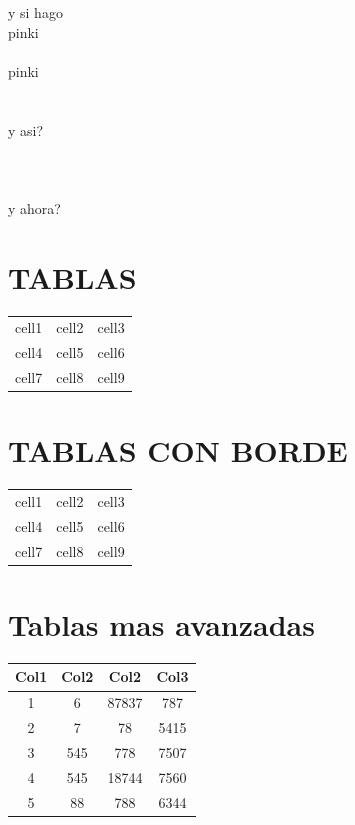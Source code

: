y si hago \\ pinki \\ \\ pinki \\ \\ \\ y asi? \\\\\\\\ y ahora?



\section*{TABLAS}
\begin{center}
\begin{tabular}{c c c}
 cell1 & cell2 & cell3 \\ 
 cell4 & cell5 & cell6 \\  
 cell7 & cell8 & cell9    
\end{tabular}
\end{center}


\section*{TABLAS CON BORDE}
\begin{center}
\begin{tabular}{|c|c|c|} 
 \hline
 cell1 & cell2 & cell3 \\ 
 cell4 & cell5 & cell6 \\ 
 cell7 & cell8 & cell9 \\ 
 \hline
\end{tabular}
\end{center}






\section* {Tablas mas avanzadas}
\begin{center}
 \begin{tabular}{||c c c c||} 
 \hline
 Col1 & Col2 & Col2 & Col3 \\ [0.5ex] 
 \hline\hline
 1 & 6 & 87837 & 787 \\ 
 \hline
 2 & 7 & 78 & 5415 \\
 \hline
 3 & 545 & 778 & 7507 \\
 \hline
 4 & 545 & 18744 & 7560 \\
 \hline
 5 & 88 & 788 & 6344 \\ [1ex] 
 \hline
\end{tabular}
\end{center} 

